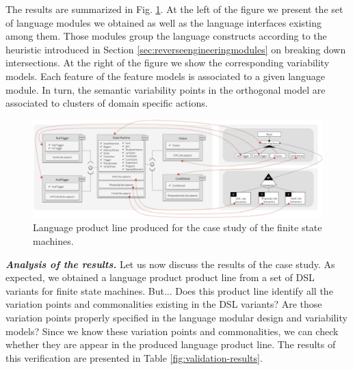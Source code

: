 The results are summarized in Fig. \ref{fig:results-casestudy}. At the left of the figure we present the set of language modules we obtained as well as the language interfaces existing among them. Those modules group the language constructs according to the heuristic introduced in Section \ref{sec:reverseengineeringmodules} on breaking down intersections. At the right of the figure we show the corresponding variability models. Each feature of the feature models is associated to a given language module. In turn, the semantic variability points in the orthogonal model are associated to clusters of domain specific actions.


\begin{figure}
\centering
\includegraphics[width=1\linewidth]{images/results-casestudy.png}
\caption{Language product line produced for the case study of the finite state machines. }
\label{fig:results-casestudy}
\end{figure}

\vspace{2mm}
\textbf{\textit{Analysis of the results.}} Let us now discuss the results of the case study. As expected, we obtained a language product product line from a set of DSL variants for finite state machines. But... Does this product line identify all the variation points and commonalities existing in the DSL variants? Are those variation points properly specified in the language modular design and variability models? Since we know these variation points and commonalities, we can check whether they are appear in the produced language product line. The results of this verification are presented in Table \ref{fig:validation-results}.


